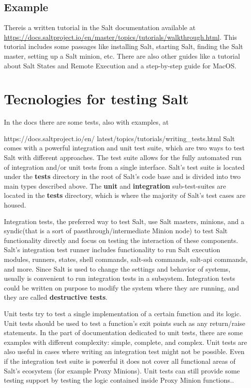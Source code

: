 \documentclass[12pt,a4paper,openright,twoside]{book}
\begin{document}
\subsection{Example}
Thereis a written tutorial in the Salt documentation available at \url{https://docs.saltproject.io/en/master/topics/tutorials/walkthrough.html}.
This tutorial includes some passages like installing Salt, starting Salt, finding the Salt master, setting up a Salt minion, etc.
There are also other guides like a tutorial about Salt States and Remote Execution and a step-by-step guide for MacOS.

\section{Tecnologies for testing Salt}
In the docs there are some tests, also with examples, at


https://docs.saltproject.io/en/
latest/topics/tutorials/writing\_tests.html
Salt comes with a powerful integration and unit test suite, which are two ways to test Salt with different approaches.
The test suite allows for the fully automated run of integration and/or unit tests from a single interface.
Salt's test suite is located under the \textbf{tests} directory in the root of Salt's code base and is divided into two main types described above.
The \textbf{unit} and \textbf{integration} sub-test-suites are located in the \textbf{tests} directory, which is where the majority of Salt's test cases are housed.\cite{saltDocTest}


Integration tests, the preferred way to test Salt, use Salt masters, minions, and a syndic(that is a sort of passthrough/intermediate Minion node) to test Salt functionality directly and focus on testing the interaction of these components.
Salt's integration test runner includes functionality to run Salt execution modules, runners, states, shell commands, salt-ssh commands, salt-api commands, and more.
Since Salt is used to change the settings and behavior of systems, usually is convenient to run integration tests in a subsystem.
Integration tests could be written on purpose to modify the system where they are running, and they are called \textbf{destructive tests}\cite{saltDocTest}.


Unit tests try to test a single implementation of a certain function and its logic. Unit tests should be used to test a function's exit points such as any return/raise statements.
In the part of documentation dedicated to unit tests, there are some examples with different complexity: simple, complete, and complex.
Unit tests are also useful in cases where writing an integration test might not be possible.
Even if the integration test suite is powerful it does not cover all functional areas of Salt's ecosystem (for example Proxy Minions).
Unit tests can still provide some testing support by testing the logic contained inside Proxy Minion functions.\cite{saltDocTest}.
\end{document}
